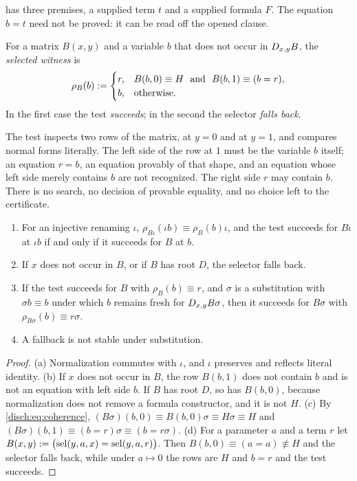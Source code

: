  has three premises, a supplied term $t$ and a supplied
formula $F$. The equation $b=t$ need not be proved: it can be read off the
opened clause.

\begin{definition}[Selector]
\label{disch:def:selector}
For a matrix $B(x,y)$ and a variable $b$ that does not occur in
$D_{x,y}B$, the \emph{selected witness} is
\[
 \rho_B(b)\mathrel{:=}
 \begin{cases}
 r,&B(b,0)\equiv H\ \text{ and }\ B(b,1)\equiv(b=r),\\
 b,&\text{otherwise.}
 \end{cases}
\]
In the first case the test \emph{succeeds}; in the second the selector
\emph{falls back}.
\end{definition}

The test inspects two rows of the matrix, at $y=0$ and at $y=1$, and
compares normal forms literally. The left side of the row at $1$ must be
the variable $b$ itself; an equation $r=b$, an equation provably of that
shape, and an equation whose left side merely contains $b$ are not
recognized. The right side $r$ may contain $b$. There is no search, no
decision of provable equality, and no choice left to the certificate.

\begin{lemma}
\label{disch:lem:selector}
\begin{enumerate}[label=\textup{(\alph*)}]
\item For an injective renaming $\iota$,
 $\rho_{B\iota}(\iota b)\equiv\rho_B(b)\iota$, and the test succeeds for
 $B\iota$ at $\iota b$ if and only if it succeeds for $B$ at $b$.
\item If $x$ does not occur in $B$, or if $B$ has root $D$, the selector
 falls back.
\item If the test succeeds for $B$ with $\rho_B(b)\equiv r$, and $\sigma$
 is a substitution with $\sigma b\equiv b$ under which $b$ remains fresh
 for $D_{x,y}B\sigma$, then it succeeds for $B\sigma$ with
 $\rho_{B\sigma}(b)\equiv r\sigma$.
\item A fallback is not stable under substitution.
\end{enumerate}
\end{lemma}

\begin{proof}
(a) Normalization commutes with $\iota$, and $\iota$ preserves and
reflects literal identity. (b) If $x$ does not occur in $B$, the row
$B(b,1)$ does not contain $b$ and is not an equation with left side $b$.
If $B$ has root $D$, so has $B(b,0)$, because normalization does not remove
a formula constructor, and it is not $H$. (c) By
\eqref{disch:eq:coherence}, $(B\sigma)(b,0)\equiv B(b,0)\sigma\equiv
H\sigma\equiv H$ and
$(B\sigma)(b,1)\equiv(b=r)\sigma\equiv(b=r\sigma)$. (d) For a parameter
$a$ and a term $r$ let $B(x,y)\mathrel{:=}\bigl(\operatorname{sel}(y,a,x)=\operatorname{sel}(y,a,r)\bigr)$.
Then $B(b,0)\equiv(a=a)\not\equiv H$ and the selector falls back, while
under $a\mapsto 0$ the rows are $H$ and $b=r$ and the test succeeds.
\end{proof}

